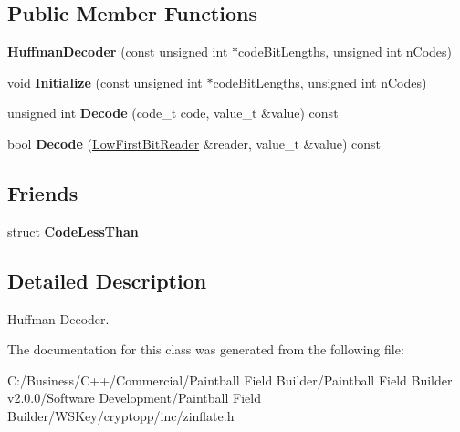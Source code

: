 \subsection*{Public Member Functions}
\begin{DoxyCompactItemize}
\item 
\hypertarget{class_huffman_decoder_ae42277c30c16af4ee9f830bc92be8aa8}{
{\bfseries HuffmanDecoder} (const unsigned int $\ast$codeBitLengths, unsigned int nCodes)}
\label{class_huffman_decoder_ae42277c30c16af4ee9f830bc92be8aa8}

\item 
\hypertarget{class_huffman_decoder_a66275670f30366de75c3bcb506c657f5}{
void {\bfseries Initialize} (const unsigned int $\ast$codeBitLengths, unsigned int nCodes)}
\label{class_huffman_decoder_a66275670f30366de75c3bcb506c657f5}

\item 
\hypertarget{class_huffman_decoder_a32c424a894a24ea4d0aae95c3d30e806}{
unsigned int {\bfseries Decode} (code\_\-t code, value\_\-t \&value) const }
\label{class_huffman_decoder_a32c424a894a24ea4d0aae95c3d30e806}

\item 
\hypertarget{class_huffman_decoder_a0ba809a0515ad70df30c6965fa6919a7}{
bool {\bfseries Decode} (\hyperlink{class_low_first_bit_reader}{LowFirstBitReader} \&reader, value\_\-t \&value) const }
\label{class_huffman_decoder_a0ba809a0515ad70df30c6965fa6919a7}

\end{DoxyCompactItemize}
\subsection*{Friends}
\begin{DoxyCompactItemize}
\item 
\hypertarget{class_huffman_decoder_ac3bc64943c6ab90653d34b0eb5fc3985}{
struct {\bfseries CodeLessThan}}
\label{class_huffman_decoder_ac3bc64943c6ab90653d34b0eb5fc3985}

\end{DoxyCompactItemize}


\subsection{Detailed Description}
Huffman Decoder. 

The documentation for this class was generated from the following file:\begin{DoxyCompactItemize}
\item 
C:/Business/C++/Commercial/Paintball Field Builder/Paintball Field Builder v2.0.0/Software Development/Paintball Field Builder/WSKey/cryptopp/inc/zinflate.h\end{DoxyCompactItemize}
